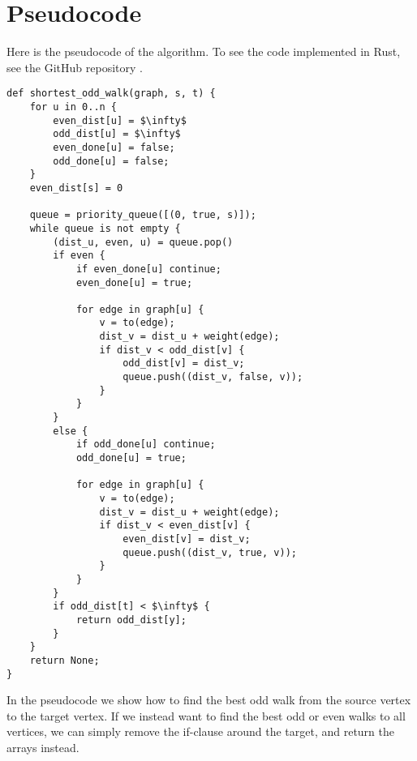 \section{Pseudocode}
Here is the pseudocode of the algorithm. To see the code implemented in Rust, see the GitHub repository \cite{source:codebase}.

\begin{lstlisting}[caption={Shortest Odd Walk},label=Listing,mathescape=true]
def shortest_odd_walk(graph, s, t) {
    for u in 0..n {
        even_dist[u] = $\infty$
        odd_dist[u] = $\infty$
        even_done[u] = false;
        odd_done[u] = false;
    }
    even_dist[s] = 0

    queue = priority_queue([(0, true, s)]);
    while queue is not empty {
        (dist_u, even, u) = queue.pop()
        if even {
            if even_done[u] continue;
            even_done[u] = true;

            for edge in graph[u] {
                v = to(edge);
                dist_v = dist_u + weight(edge);
                if dist_v < odd_dist[v] {
                    odd_dist[v] = dist_v;
                    queue.push((dist_v, false, v));
                }
            }
        }
        else {
            if odd_done[u] continue;
            odd_done[u] = true;

            for edge in graph[u] {
                v = to(edge);
                dist_v = dist_u + weight(edge);
                if dist_v < even_dist[v] {
                    even_dist[v] = dist_v;
                    queue.push((dist_v, true, v));
                }
            }
        }
        if odd_dist[t] < $\infty$ {
            return odd_dist[y];
        }
    }
    return None;
}
\end{lstlisting}

In the pseudocode we show how to find the best odd walk from the source vertex to the target vertex. If we instead want to find the best odd or even walks to all vertices, we can simply remove the if-clause around the target, and return the arrays instead.